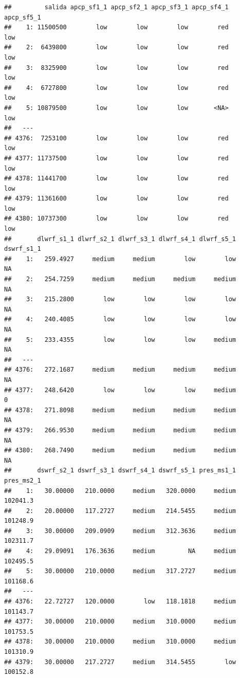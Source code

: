 \documentclass[
  11pt,
  a4paper,
]{article}
\begin{document}
\begin{verbatim}
##         salida apcp_sf1_1 apcp_sf2_1 apcp_sf3_1 apcp_sf4_1 apcp_sf5_1
##    1: 11500500        low        low        low        red        low
##    2:  6439800        low        low        low        red        low
##    3:  8325900        low        low        low        red        low
##    4:  6727800        low        low        low        red        low
##    5: 10879500        low        low        low       <NA>        low
##   ---                                                                
## 4376:  7253100        low        low        low        red        low
## 4377: 11737500        low        low        low        red        low
## 4378: 11441700        low        low        low        red        low
## 4379: 11361600        low        low        low        red        low
## 4380: 10737300        low        low        low        red        low
##       dlwrf_s1_1 dlwrf_s2_1 dlwrf_s3_1 dlwrf_s4_1 dlwrf_s5_1 dswrf_s1_1
##    1:   259.4927     medium     medium        low        low         NA
##    2:   254.7259     medium     medium     medium     medium         NA
##    3:   215.2800        low        low        low        low         NA
##    4:   240.4085        low        low        low        low         NA
##    5:   233.4355        low        low        low     medium         NA
##   ---                                                                  
## 4376:   272.1687     medium     medium     medium     medium         NA
## 4377:   248.6420        low        low        low     medium          0
## 4378:   271.8098     medium     medium     medium     medium         NA
## 4379:   266.9530     medium     medium     medium     medium         NA
## 4380:   268.7490     medium     medium     medium     medium         NA
##       dswrf_s2_1 dswrf_s3_1 dswrf_s4_1 dswrf_s5_1 pres_ms1_1 pres_ms2_1
##    1:   30.00000   210.0000     medium   320.0000     medium   102041.3
##    2:   20.00000   117.2727     medium   214.5455     medium   101248.9
##    3:   30.00000   209.0909     medium   312.3636     medium   102311.7
##    4:   29.09091   176.3636     medium         NA     medium   102495.5
##    5:   30.00000   210.0000     medium   317.2727     medium   101168.6
##   ---                                                                  
## 4376:   22.72727   120.0000        low   118.1818     medium   101143.7
## 4377:   30.00000   210.0000     medium   310.0000     medium   101753.5
## 4378:   30.00000   210.0000     medium   310.0000     medium   101310.9
## 4379:   30.00000   217.2727     medium   314.5455        low   100152.8

\end{verbatim}
\end{document}
